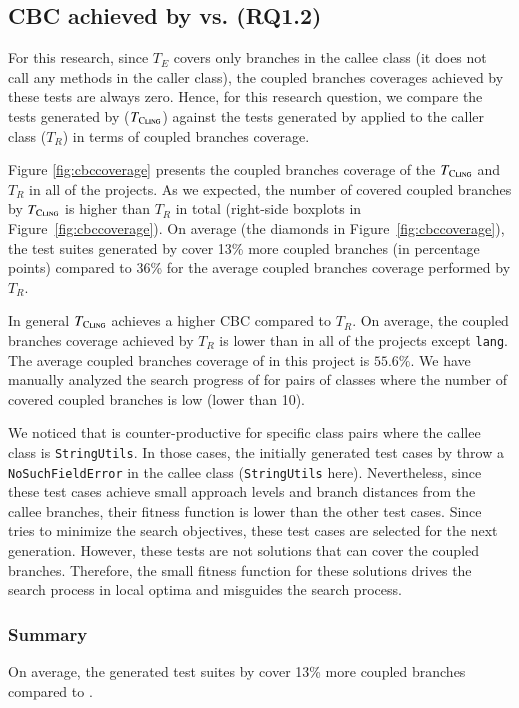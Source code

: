 \subsection{CBC achieved by \cling vs. \evosuite (RQ1.2)}
For this research, since $T_E$ covers only branches in the callee class (\ie it does not call any methods in the caller class), the coupled branches coverages achieved by these tests are always zero. 
Hence, for this research question, we compare the tests generated by \cling ($T_{\textsc{Cling}}$) against the tests generated by \evosuite applied to the caller class ($T_R$) in terms of coupled branches coverage. 

Figure \ref{fig:cbccoverage} presents the coupled branches coverage of the $T_{\textsc{Cling}}$ and $T_{R}$ in all of the projects. As we expected, the number of covered coupled branches by $T_{\textsc{Cling}}$ is higher than $T_{R}$ in total (right-side boxplots in Figure~\ref{fig:cbccoverage}). On average (the diamonds in Figure~\ref{fig:cbccoverage}), the test suites generated by \cling cover 13\% more coupled branches (in percentage points) compared to 36\% for the average coupled branches coverage performed by $T_{R}$.


In general $T_{\textsc{Cling}}$ achieves a higher CBC compared to $T_{R}$. On average, the coupled branches coverage achieved by $T_{R}$ is lower than \cling in all of the projects except \texttt{lang}. The average coupled branches coverage of \evosuite in this project is $55.6\%$. We have manually analyzed the search progress of \cling  for pairs of classes where the number of covered coupled branches is low (\ie lower than 10). 

We noticed that \cling is counter-productive for specific class pairs where the callee class is \texttt{StringUtils}. In those cases, the initially generated test cases by \cling throw a \texttt{NoSuchFieldError} in the callee class (\texttt{StringUtils} here). Nevertheless, since these test cases achieve small approach levels and branch distances from the callee branches, their fitness function is lower than the other test cases. Since \cling tries to minimize the search objectives, these test cases are selected for the next generation. However, these tests are not solutions that can cover the coupled branches. Therefore, the small fitness function for these solutions drives the search process in local optima and misguides the search process.
 

\subsubsection{Summary}
On average, the generated test suites by \cling cover 13\% more coupled branches compared to \evosuite. 

